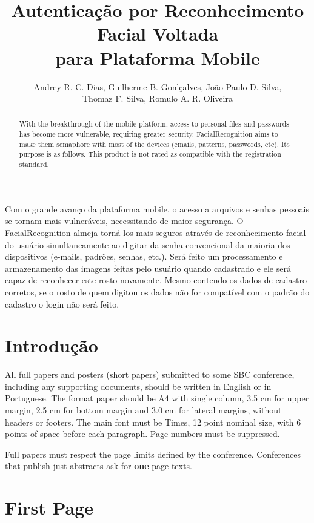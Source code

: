 \documentclass[12pt]{article}
\title{
	Autenticação por Reconhecimento Facial Voltada\\
	para Plataforma Mobile
}
\author{
	Andrey R. C. Dias, 
	Guilherme B. Gonlçalves, 
	João Paulo D. Silva, \\
	Thomaz F. Silva,
	Romulo A. R. Oliveira
}
\begin{document}
 

\maketitle

\begin{abstract}
With the breakthrough of the mobile platform, access to personal files and passwords has become more vulnerable, requiring greater security. FacialRecognition aims to make them semaphore with most of the devices (emails, patterns, passwords, etc). Its purpose is as follows. This product is not rated as compatible with the registration standard.
\end{abstract}
     
\begin{resumo} 
  Com o grande avanço da plataforma mobile, o acesso a arquivos e senhas pessoais se tornam mais vulneráveis, necessitando de maior segurança. O FacialRecognition almeja torná-los mais seguros através de reconhecimento facial do usuário simultaneamente ao digitar da senha convencional da maioria dos dispositivos (e-mails, padrões, senhas, etc.). Será feito um processamento e armazenamento das imagens feitas pelo usuário quando cadastrado e ele será capaz de reconhecer este rosto novamente. Mesmo contendo os dados de cadastro corretos, se o rosto de quem digitou os dados não for compatível com o padrão do cadastro o login não será feito.
\end{resumo}


\section{Introdução}

All full papers and posters (short papers) submitted to some SBC conference,
including any supporting documents, should be written in English or in
Portuguese. The format paper should be A4 with single column, 3.5 cm for upper
margin, 2.5 cm for bottom margin and 3.0 cm for lateral margins, without
headers or footers. The main font must be Times, 12 point nominal size, with 6
points of space before each paragraph. Page numbers must be suppressed.

Full papers must respect the page limits defined by the conference.
Conferences that publish just abstracts ask for \textbf{one}-page texts.

\section{First Page} \label{sec:firstpage}
\end{document}
